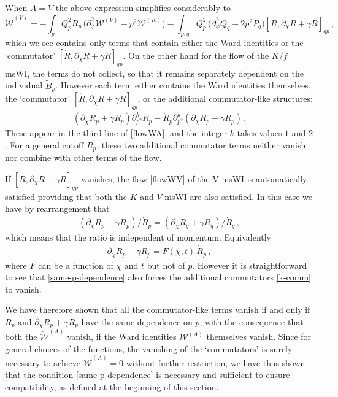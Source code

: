 \documentclass[11pt]{book} %
\numberwithin{equation}{chapter}
\begin{document}
When $A = V$ the above expression simplifies considerably to
\begin{equation}
\label{flowWV}
	 \mathcal{\dot W}^{(V)}=-  \int_p  Q^2_p  \dot R_p\, \bigg( \partial^2_{\varphi} \mathcal{W}^{(V)}
	  - p^2  \mathcal{W}^{(K)} \bigg) - \int_{p,q}   Q^2_p\, \bigg(  \partial_{\varphi}^2 Q_q
	  - 2 p^2 P_q \bigg) [ \dot R , \partial_{\chi} R + \gamma R ]_{qp} \,,
\end{equation}
which we see contains only terms that contain either the Ward identities or the
`commutator' $[ \dot R , \partial_{\chi} R + \gamma R ]_{qp}$.
On the other hand for the flow of the $K/f$ msWI, the terms do not collect,
so that it remains separately dependent on the individual $\tilde B_p$.
However each term either contains the Ward identities themselves,
the `commutator'  $[ \dot R , \partial_{\chi} R + \gamma R ]_{qp}$,
or the additional commutator-like structures:
\begin{align}
  \label{k-comm}
  \left(\partial_\chi R_p + \gamma R_p\right) \partial_{p^2}^k \dot R_p - \dot R_p \partial_{p^2}^k \left(\partial_\chi R_p + \gamma R_p\right)\,.
\end{align}
These appear in the third line of \eqref{flowWA}, and the integer $k$ takes values $1$ and $2$.
For a general cutoff $R_p$, these two additional commutator terms neither vanish nor combine with
other terms of the flow.

If $[ \dot R , \partial_{\chi} R + \gamma R ]_{qp}$ vanishes,
the flow \eqref{flowWV} of the V msWI is automatically satisfied providing that both
the $K$ and $V$ msWI are also satisfied. In this case we have by rearrangement that
\begin{align}
  \left(
    \partial_\chi R_p + \gamma R_p
  \right)/\dot R_p = \left( \partial_\chi R_q + \gamma R_q \right)/\dot R_q\,,
\end{align}
which means that the ratio is independent of momentum. Equivalently
\begin{align}
  \label{same-p-dependence}
  \partial_\chi R_p + \gamma R_p = F(\chi,t) \,\dot R_p \,,
\end{align}
where $F$ can be a function of $\chi$ and $t$ but not of $p$.
However it is straightforward to see that \eqref{same-p-dependence} also forces the additional
commutators \eqref{k-comm} to vanish.

We have therefore shown that all the commutator-like terms vanish if and only if
$\dot R_p$ and $\partial_{\chi} R_p + \gamma R_p$ have the same dependence on $p$,
with the consequence  that both the $\mathcal{\dot W}^{(A)}$ vanish,
if the Ward identities $\mathcal{W}^{(A)}$ themselves vanish.
Since for general choices of the functions, the vanishing of the `commutators' is surely necessary
to achieve $\mathcal{\dot W}^{(A)}=0$ without further restriction,
we have thus shown that the condition \eqref{same-p-dependence} is necessary and sufficient to ensure
compatibility, as defined at the beginning of this section.
\end{document}

